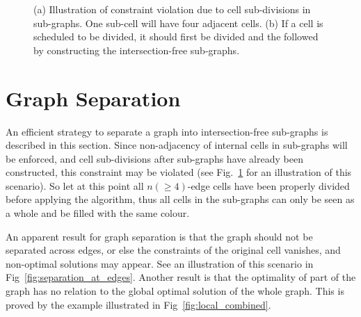 \documentclass[journal]{IEEEtran}
\begin{document}
\begin{figure}[t]
\centering
{}
\caption{(a) Illustration of constraint violation due to cell sub-divisions in sub-graphs. One sub-cell will have four adjacent cells. (b) If a cell is scheduled to be divided, it should first be divided and the followed by constructing the intersection-free sub-graphs.}
\label{fig:constraint_violation}
\end{figure}

\section{Graph Separation}
\label{section_graph_separation}
 An efficient strategy to separate a graph into intersection-free sub-graphs is described in this section. 
Since non-adjacency of internal cells in sub-graphs will be enforced, and cell sub-divisions after sub-graphs have already been constructed, 
this constraint may be violated (see Fig.~\ref{fig:constraint_violation} for an illustration of this scenario).
So let at this point all $n(\geq 4)$-edge cells have been properly divided before applying the algorithm, 
thus all cells in the sub-graphs can only be seen as a whole and be filled with the same colour. 


An apparent result for graph separation is that the graph should not be separated across edges, or else the constraints of the original cell vanishes, and non-optimal solutions may appear. See an illustration of this scenario in Fig~\ref{fig:separation_at_edges}. 
Another result is that the optimality of part of the graph has no relation to the global optimal solution of the whole graph. 
This is proved by the example illustrated in Fig~\ref{fig:local_combined}. 
\end{document}
